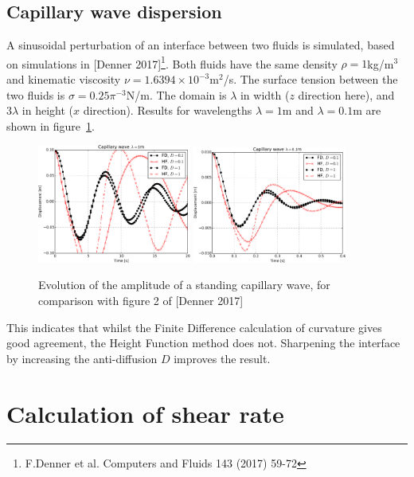 \documentclass[12pt,a4paper]{article}
\begin{document}
\subsection{Capillary wave dispersion}

A sinusoidal perturbation of an interface between two fluids is simulated, based on simulations in [Denner 2017]\footnote{F.Denner et al. Computers and Fluids 143 (2017) 59-72}. Both fluids have the same density $\rho=1$kg/m$^3$ and kinematic viscosity $\nu = 1.6394\times 10^{−3}$m$^2$/s. The surface tension between the two fluids is $\sigma=0.25\pi^{-3}$N/m. The domain is $\lambda$ in width ($z$ direction here), and $3\lambda$ in height ($x$ direction). Results for wavelengths $\lambda=1$m and $\lambda=0.1$m are shown in figure~\ref{fig:capillary}.
\begin{figure}[h]
\centering
\includegraphics[width=0.45\textwidth]{capillary_2.pdf}
\includegraphics[width=0.45\textwidth]{capillary_1.pdf}
\caption{Evolution of the amplitude of a standing capillary wave, for comparison with figure 2 of [Denner 2017]}
\label{fig:capillary}
\end{figure}
This indicates that whilst the Finite Difference calculation of curvature gives good agreement, the Height Function method does not. Sharpening the interface by increasing the anti-diffusion $D$ improves the result.

\section{Calculation of shear rate}
\label{sec:shear_rate}
\end{document}
